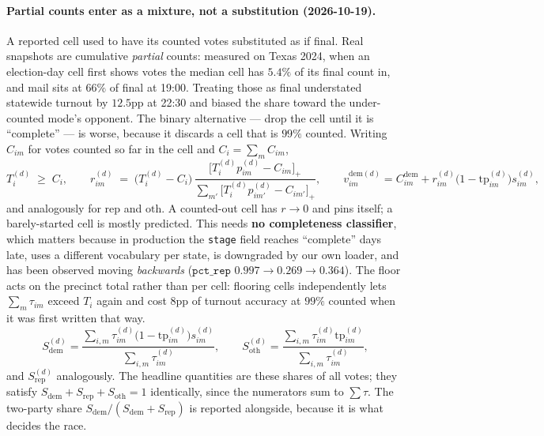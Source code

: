 \documentclass[11pt]{article}
\newcommand{\dem}{\mathrm{dem}}
\newcommand{\rep}{\mathrm{rep}}
\newcommand{\oth}{\mathrm{oth}}
\newcommand{\tp}{\mathrm{tp}}
\begin{document}
\paragraph{Partial counts enter as a mixture, not a substitution (2026-10-19).} A reported
cell used to have its counted votes substituted as if final. Real snapshots are cumulative
\emph{partial} counts: measured on Texas 2024, when an election-day cell first shows votes
the median cell has $5.4\%$ of its final count in, and mail sits at $66\%$ of final at
19:00. Treating those as final understated statewide turnout by $12.5$pp at 22:30 and
biased the share toward the under-counted mode's opponent. The binary alternative --- drop
the cell until it is ``complete'' --- is worse, because it discards a cell that is $99\%$
counted. Writing $C_{im}$ for votes counted so far in the cell and $C_i = \sum_m C_{im}$,
\begin{equation}
  T^{(d)}_i \;\ge\; C_i,
  \qquad
  r^{(d)}_{im} \;=\; \big(T^{(d)}_i - C_i\big)\,
    \frac{\big[T^{(d)}_i p^{(d)}_{im} - C_{im}\big]_+}{\sum_{m'}\big[T^{(d)}_i p^{(d)}_{im'} - C_{im'}\big]_+},
  \qquad
  v^{\dem(d)}_{im} = C^{\dem}_{im} + r^{(d)}_{im}\big(1-\tp^{(d)}_{im}\big)s^{(d)}_{im},
  \label{eq:mixture}
\end{equation}
and analogously for $\rep$ and $\oth$. A counted-out cell has $r \to 0$ and pins itself; a
barely-started cell is mostly predicted. This needs \textbf{no completeness classifier},
which matters because in production the \texttt{stage} field reaches ``complete'' days
late, uses a different vocabulary per state, is downgraded by our own loader, and has been
observed moving \emph{backwards} ($\mathtt{pct\_rep}$ $0.997 \to 0.269 \to 0.364$). The
floor acts on the precinct total rather than per cell: flooring cells independently lets
$\sum_m \tau_{im}$ exceed $T_i$ again and cost $8$pp of turnout accuracy at $99\%$ counted
when it was first written that way.
\begin{equation}
  S^{(d)}_{\dem} = \frac{\sum_{i,m} \tau^{(d)}_{im}\big(1-\tp^{(d)}_{im}\big)s^{(d)}_{im}}
                        {\sum_{i,m} \tau^{(d)}_{im}},
  \qquad
  S^{(d)}_{\oth} = \frac{\sum_{i,m} \tau^{(d)}_{im}\tp^{(d)}_{im}}{\sum_{i,m} \tau^{(d)}_{im}},
  \label{eq:agg}
\end{equation}
and $S^{(d)}_{\rep}$ analogously. The headline quantities are these shares of all votes;
they satisfy $S_{\dem} + S_{\rep} + S_{\oth} = 1$ identically, since the numerators sum to
$\sum \tau$. The two-party share $S_{\dem}/(S_{\dem} + S_{\rep})$ is reported alongside,
because it is what decides the race.
\end{document}
